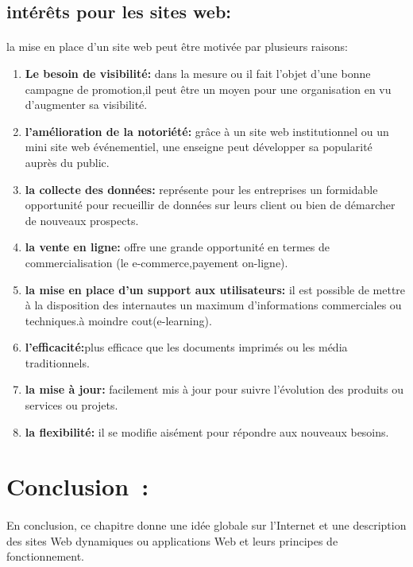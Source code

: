 \subsection{intérêts pour les sites web:}
\paragraph{}
la mise en place d'un site web peut être motivée par plusieurs raisons:
\begin{enumerate}
	\item \textbf{Le besoin de visibilité:} dans la mesure ou il fait l'objet d'une bonne campagne de promotion,il peut être un moyen pour une organisation en vu d'augmenter sa visibilité.
	\item \textbf{l'amélioration de la notoriété:} grâce à un site web institutionnel ou un mini site web événementiel, une enseigne peut développer sa popularité auprès du public.
	\item \textbf{la collecte des données:} représente pour les entreprises un formidable opportunité pour recueillir de données sur leurs client ou bien de démarcher de nouveaux prospects.
	\item \textbf{la vente en ligne:} offre une grande opportunité en termes de commercialisation (le e-commerce,payement on-ligne).
	\item \textbf{la mise en place d'un support aux utilisateurs:} il est possible de mettre à la disposition des internautes un maximum d'informations commerciales ou techniques.à moindre cout(e-learning).
	\item \textbf{l'efficacité:}plus efficace que les documents imprimés ou les média traditionnels.
	\item \textbf{la mise à jour:} facilement mis à jour pour suivre l'évolution des produits ou services ou projets.
	\item \textbf{la flexibilité:} il se modifie aisément pour répondre aux nouveaux besoins.
\end{enumerate}

\section{Conclusion :}
\paragraph{}
En conclusion, ce chapitre donne une idée globale sur l'Internet et
une description des sites Web dynamiques ou applications Web et leurs principes de fonctionnement.